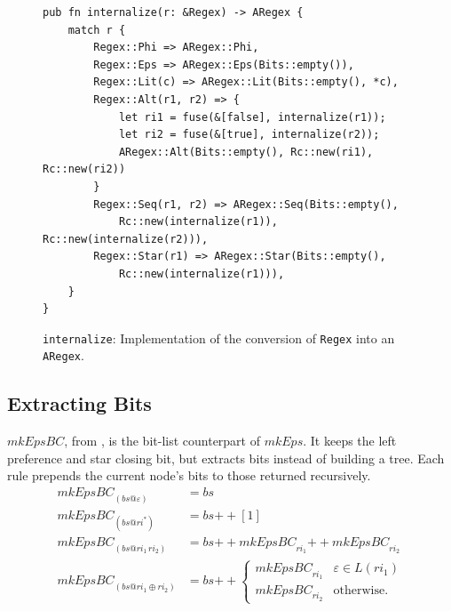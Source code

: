 \begin{figure}[H]
\small
\begin{verbatim}
pub fn internalize(r: &Regex) -> ARegex {
    match r {
        Regex::Phi => ARegex::Phi,
        Regex::Eps => ARegex::Eps(Bits::empty()),
        Regex::Lit(c) => ARegex::Lit(Bits::empty(), *c),
        Regex::Alt(r1, r2) => {
            let ri1 = fuse(&[false], internalize(r1));
            let ri2 = fuse(&[true], internalize(r2));
            ARegex::Alt(Bits::empty(), Rc::new(ri1), Rc::new(ri2))
        }
        Regex::Seq(r1, r2) => ARegex::Seq(Bits::empty(),
            Rc::new(internalize(r1)), Rc::new(internalize(r2))),
        Regex::Star(r1) => ARegex::Star(Bits::empty(),
            Rc::new(internalize(r1))),
    }
}
\end{verbatim}
\caption{\texttt{internalize}: 
Implementation of the conversion of \texttt{Regex} into an \texttt{ARegex}.}
\label{fig:internalize-rust}
\end{figure}

%
%
%

\subsection{Extracting Bits}
\label{sec:mkepsbc-theory}

$\mathit{mkEpsBC}$, from \citep[Fig.~5]{sulzmannlu2014}, 
is the bit-list counterpart of $\mathit{mkEps}$. 
It keeps the left preference and star closing bit, 
but extracts bits instead of building a tree. 
Each rule prepends the current node's bits to those returned recursively.
\begin{equation}\label{eq:mkepsbc}
\begin{aligned}
\mathit{mkEpsBC}_{(bs@\varepsilon)} &= bs \\[2pt]
\mathit{mkEpsBC}_{(bs@\mathit{ri}^{*})} &= bs \mathbin{+\!\!+} [1] \\[2pt]
\mathit{mkEpsBC}_{(bs@\mathit{ri}_1\, \mathit{ri}_2)} &=
  bs \mathbin{+\!\!+} \mathit{mkEpsBC}_{\mathit{ri}_1}
  \mathbin{+\!\!+} \mathit{mkEpsBC}_{\mathit{ri}_2} \\[2pt]
\mathit{mkEpsBC}_{(bs@\mathit{ri}_1\oplus\mathit{ri}_2)} &=
  bs \mathbin{+\!\!+}
  \begin{cases}
    \mathit{mkEpsBC}_{\mathit{ri}_1} & \varepsilon \in L(\mathit{ri}_1) \\
    \mathit{mkEpsBC}_{\mathit{ri}_2} & \text{otherwise.}
  \end{cases}
\end{aligned}
\end{equation}

